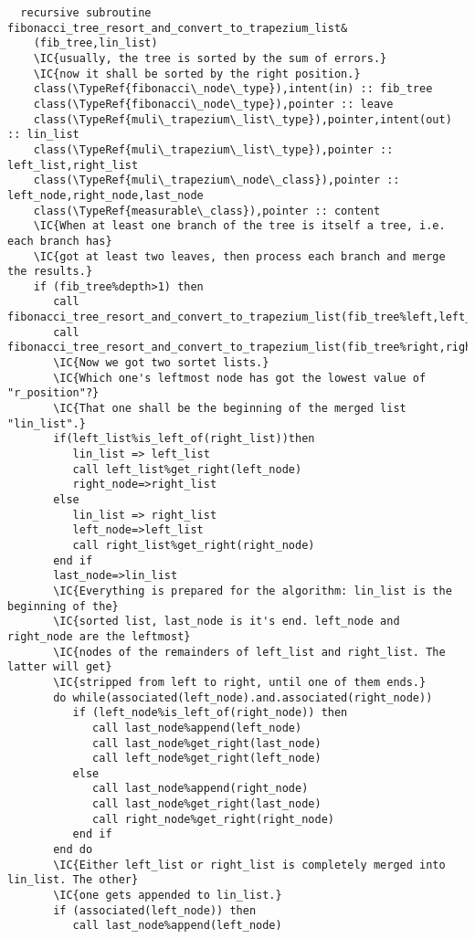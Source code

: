 \begin{Verbatim}
  recursive subroutine fibonacci_tree_resort_and_convert_to_trapezium_list&
    (fib_tree,lin_list)
    \IC{usually, the tree is sorted by the sum of errors.}
    \IC{now it shall be sorted by the right position.}
    class(\TypeRef{fibonacci\_node\_type}),intent(in) :: fib_tree
    class(\TypeRef{fibonacci\_node\_type}),pointer :: leave
    class(\TypeRef{muli\_trapezium\_list\_type}),pointer,intent(out) :: lin_list
    class(\TypeRef{muli\_trapezium\_list\_type}),pointer :: left_list,right_list
    class(\TypeRef{muli\_trapezium\_node\_class}),pointer :: left_node,right_node,last_node
    class(\TypeRef{measurable\_class}),pointer :: content
    \IC{When at least one branch of the tree is itself a tree, i.e. each branch has}
    \IC{got at least two leaves, then process each branch and merge the results.}
    if (fib_tree%depth>1) then
       call fibonacci_tree_resort_and_convert_to_trapezium_list(fib_tree%left,left_list)
       call fibonacci_tree_resort_and_convert_to_trapezium_list(fib_tree%right,right_list)
       \IC{Now we got two sortet lists.}
       \IC{Which one's leftmost node has got the lowest value of "r_position"?}
       \IC{That one shall be the beginning of the merged list "lin_list".}
       if(left_list%is_left_of(right_list))then
          lin_list => left_list
          call left_list%get_right(left_node)
          right_node=>right_list
       else
          lin_list => right_list
          left_node=>left_list
          call right_list%get_right(right_node)
       end if
       last_node=>lin_list
       \IC{Everything is prepared for the algorithm: lin_list is the beginning of the}
       \IC{sorted list, last_node is it's end. left_node and right_node are the leftmost}
       \IC{nodes of the remainders of left_list and right_list. The latter will get}
       \IC{stripped from left to right, until one of them ends.}
       do while(associated(left_node).and.associated(right_node))          
          if (left_node%is_left_of(right_node)) then
             call last_node%append(left_node)
             call last_node%get_right(last_node)
             call left_node%get_right(left_node)
          else
             call last_node%append(right_node)
             call last_node%get_right(last_node)
             call right_node%get_right(right_node)
          end if
       end do
       \IC{Either left_list or right_list is completely merged into lin_list. The other}
       \IC{one gets appended to lin_list.}
       if (associated(left_node)) then
          call last_node%append(left_node)

\end{Verbatim}
